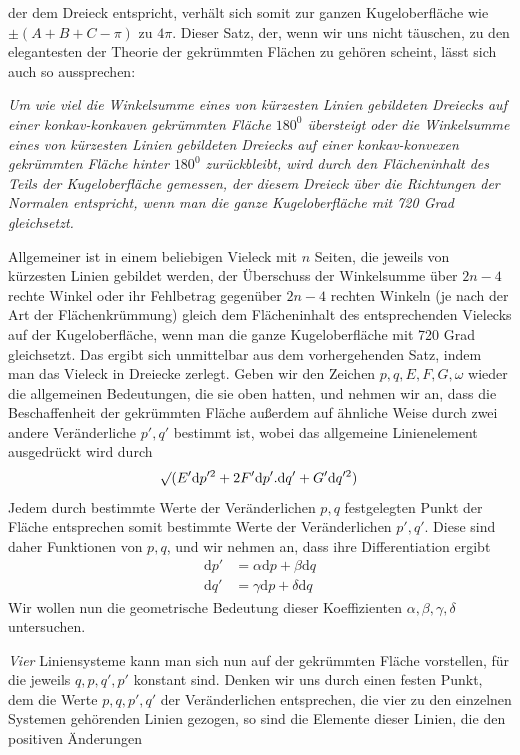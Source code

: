 %
der dem Dreieck entspricht, verhält sich somit zur ganzen Kugeloberfläche wie \(\pm(A+B+C-\pi)\) zu \(4\pi\). Dieser Satz, der, wenn wir uns nicht täuschen, zu den elegantesten der Theorie der gekrümmten Flächen zu gehören scheint, lässt sich auch so aussprechen:

\textit{Um wie viel die Winkelsumme eines von kürzesten Linien gebildeten Dreiecks auf einer konkav-konkaven gekrümmten Fläche \(180^0\) übersteigt oder die Winkelsumme eines von kürzesten Linien gebildeten Dreiecks auf einer konkav-konvexen gekrümmten Fläche hinter \(180^0\) zurückbleibt, wird durch den Flächeninhalt des Teils der Kugeloberfläche gemessen, der diesem Dreieck über die Richtungen der Normalen entspricht, wenn man die ganze Kugeloberfläche mit 720 Grad gleichsetzt.}

Allgemeiner ist in einem beliebigen Vieleck mit \(n\) Seiten, die jeweils von kürzesten Linien gebildet werden, der Überschuss der Winkelsumme über \mbox{\(2n-4\)} rechte Winkel oder ihr Fehlbetrag gegenüber \(2n-4\) rechten Winkeln (je nach der Art der Flächenkrümmung) gleich dem Flächeninhalt des entsprechenden Vielecks auf der Kugeloberfläche, wenn man die ganze Kugeloberfläche mit 720 Grad gleichsetzt. Das ergibt sich unmittelbar aus dem vorhergehenden Satz, indem man das Vieleck in Dreiecke zerlegt.
Geben wir den Zeichen \(p,q,E,F,G,\omega\) wieder die allgemeinen Bedeutungen, die sie oben hatten, und nehmen wir an, dass die Beschaffenheit der gekrümmten Fläche außerdem auf ähnliche Weise durch zwei andere Veränderliche \(p',q'\) bestimmt ist, wobei das allgemeine Linienelement ausgedrückt wird durch
\[
\mathord{{}^{}\!\surd}(E'\mathrm{d}p'^2+2F'\mathrm{d}p'\mathord{.}\mathrm{d}q'+G'\mathrm{d}q'^2)
\]
Jedem durch bestimmte Werte der Veränderlichen \(p,q\) festgelegten Punkt der Fläche entsprechen somit bestimmte Werte der Veränderlichen \(p',q'\). Diese sind daher Funktionen von \(p,q\), und wir nehmen an, dass ihre Differentiation ergibt
\[
\begin{aligned}
\mathrm{d}p'&=\alpha\mathrm{d}p+\beta\mathrm{d}q\\
\mathrm{d}q'&=\gamma\mathrm{d}p+\delta\mathrm{d}q
\end{aligned}
\]
Wir wollen nun die geometrische Bedeutung dieser Koeffizienten \(\alpha,\beta,\gamma,\delta\) untersuchen.

\textit{Vier} Liniensysteme kann man sich nun auf der gekrümmten Fläche vorstellen, für die jeweils \(q,p,q',p'\) konstant sind. Denken wir uns durch einen festen Punkt, dem die Werte \(p,q,p',q'\) der Veränderlichen entsprechen, die vier zu den einzelnen Systemen gehörenden Linien gezogen, so sind die Elemente dieser Linien, die den positiven Änderungen
